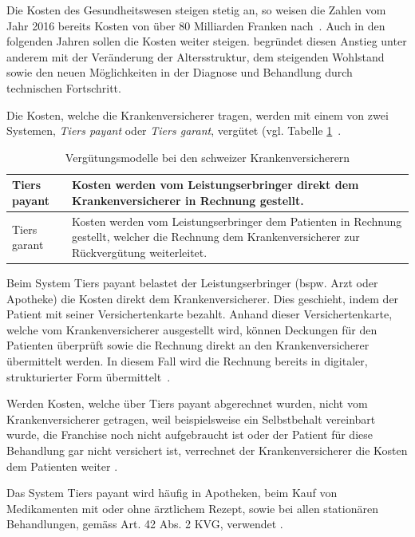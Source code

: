 Die Kosten des Gesundheitswesen steigen stetig an, so weisen die Zahlen vom Jahr 2016 bereits Kosten von über 80 Milliarden Franken nach~\autocite{BfS2018}. Auch in den folgenden Jahren sollen die Kosten weiter steigen. \textcite{Kirchgassner2009} begründet diesen Anstieg unter anderem mit der Veränderung der Altersstruktur, dem steigenden Wohlstand sowie den neuen Möglichkeiten in der Diagnose und Behandlung durch technischen Fortschritt.

Die Kosten, welche die Krankenversicherer tragen, werden mit einem von zwei Systemen, \textit{Tiers payant} oder \textit{Tiers garant}, vergütet (vgl. Tabelle \ref{tiers}~\autocite{EDI2017}. 

\begin{table}
    \renewcommand{\arraystretch}{1.25}
    \setlength{\tabcolsep}{5pt}
    \caption{Vergütungsmodelle bei den schweizer Krankenversicherern}
    \label{tiers}
    \begin{tabular}{| p{} | p{} |}
        \hline
         Tiers payant & Kosten werden vom Leistungserbringer direkt dem Krankenversicherer in Rechnung gestellt. \\
        \hline
         Tiers garant & Kosten werden vom Leistungserbringer dem Patienten in Rechnung gestellt, welcher die Rechnung dem Krankenversicherer zur Rückvergütung weiterleitet. \\
        \hline
    \end{tabular}
\end{table}

Beim System Tiers payant belastet der Leistungserbringer (bspw. Arzt oder Apotheke) die Kosten direkt dem Krankenversicherer. Dies geschieht, indem der Patient mit seiner Versichertenkarte bezahlt. Anhand dieser Versichertenkarte, welche vom Krankenversicherer ausgestellt wird, können Deckungen für den Patienten überprüft sowie die Rechnung direkt an den Krankenversicherer übermittelt werden. In diesem Fall wird die Rechnung bereits in digitaler, strukturierter Form übermittelt~\autocite{EDI2017}. 

Werden Kosten, welche über Tiers payant abgerechnet wurden, nicht vom Krankenversicherer getragen, weil beispielsweise ein Selbstbehalt vereinbart wurde, die Franchise noch nicht aufgebraucht ist oder der Patient für diese Behandlung gar nicht versichert ist, verrechnet der Krankenversicherer die Kosten dem Patienten weiter \autocite{EDI2017}.

Das System Tiers payant wird häufig in Apotheken, beim Kauf von Medikamenten mit oder ohne ärztlichem Rezept, sowie bei allen stationären Behandlungen, gemäss Art. 42 Abs. 2 KVG, verwendet \autocite{EDI2017}.

